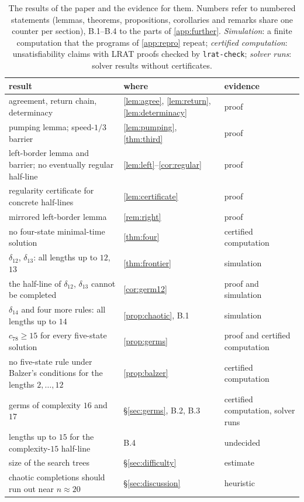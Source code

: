 \begin{table}[t]
\centering\small
\begin{tabular}{@{}>{\raggedright\arraybackslash}p{}l>{\raggedright\arraybackslash}p{}@{}}
\toprule
result & where & evidence\\
\midrule
agreement, return chain, determinacy & \ref{lem:agree}, \ref{lem:return}, \ref{lem:determinacy} & proof\\
pumping lemma; speed-$1/3$ barrier & \ref{lem:pumping}, \ref{thm:third} & proof\\
left-border lemma and barrier; no eventually regular half-line & \ref{lem:left}--\ref{cor:regular} & proof\\
regularity certificate for concrete half-lines & \ref{lem:certificate} & proof\\
mirrored left-border lemma & \ref{rem:right} & proof\\
no four-state minimal-time solution & \ref{thm:four} & certified computation\\
$\delta_{12}$, $\delta_{13}$: all lengths up to $12$, $13$ & \ref{thm:frontier} & simulation\\
the half-line of $\delta_{12}$, $\delta_{13}$ cannot be completed & \ref{cor:germ12} & proof and simulation\\
$\delta_{14}$ and four more rules: all lengths up to $14$ & \ref{prop:chaotic}, B.1 & simulation\\
$c_{78}\ge15$ for every five-state solution & \ref{prop:germs} & proof and certified computation\\
no five-state rule under Balzer's conditions for the lengths $2,\dots,12$ & \ref{prop:balzer} & certified computation\\
germs of complexity $16$ and $17$ & \S\ref{sec:germs}, B.2, B.3 & certified computation, solver runs\\
lengths up to $15$ for the complexity-$15$ half-line & B.4 & undecided\\
size of the search trees & \S\ref{sec:difficulty} & estimate\\
chaotic completions should run out near $n\approx20$ & \S\ref{sec:discussion} & heuristic\\
\bottomrule
\end{tabular}
\caption{The results of the paper and the evidence for them. Numbers
refer to numbered statements (lemmas, theorems, propositions, corollaries
and remarks share one counter per section), B.1--B.4 to the parts of
\cref{app:further}. \emph{Simulation}: a finite computation that the
programs of \cref{app:repro} repeat; \emph{certified computation}:
unsatisfiability claims with LRAT proofs checked by \texttt{lrat-check};
\emph{solver runs}: solver results without certificates.}
\label{tab:results}
\end{table}

